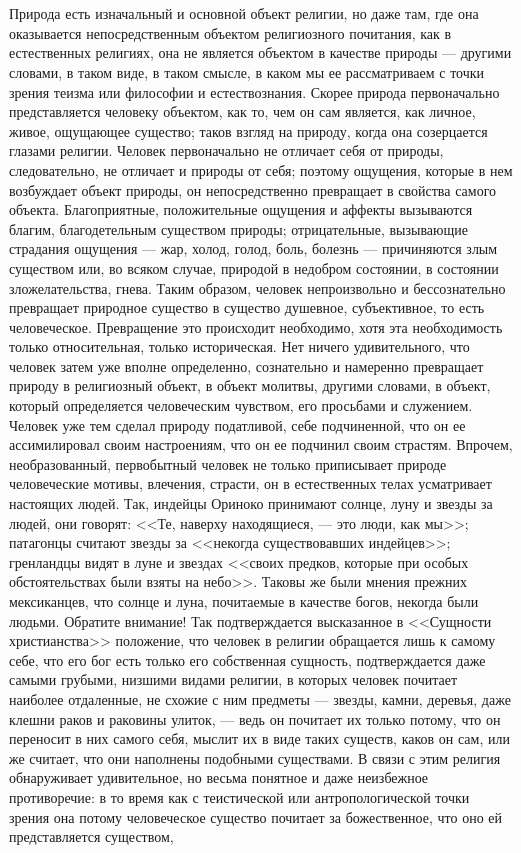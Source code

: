 \documentclass[12pt]{article}
\begin{document}
\section{}

Природа есть изначальный и основной объект религии, но даже там, где она оказывается непосредственным объектом религиозного почитания, как в естественных религиях, она не является объектом в качестве природы --- другими словами, в таком виде, в таком смысле, в каком мы ее рассматриваем с точки зрения теизма или философии и естествознания. Скорее природа первоначально представляется человеку объектом, как то, чем он сам является, как личное, живое, ощущающее существо; таков взгляд на природу, когда она созерцается глазами религии. Человек первоначально не отличает себя от природы, следовательно, не отличает и природы от себя; поэтому ощущения, которые в нем возбуждает объект природы, он непосредственно превращает в свойства самого объекта. Благоприятные, положительные ощущения и аффекты вызываются благим, благодетельным существом природы; отрицательные, вызывающие страдания ощущения --- жар, холод, голод, боль, болезнь --- причиняются злым существом или, во всяком случае, природой в недобром состоянии, в состоянии зложелательства, гнева. Таким образом, человек непроизвольно и бессознательно превращает природное существо в существо душевное, субъективное, то есть человеческое. Превращение это происходит необходимо, хотя эта необходимость только относительная, только историческая. Нет ничего удивительного, что человек затем уже вполне определенно, сознательно и намеренно превращает природу в религиозный объект, в объект молитвы, другими словами, в объект, который определяется человеческим чувством, его просьбами и служением. Человек уже тем сделал природу податливой, себе подчиненной, что он ее ассимилировал своим настроениям, что он ее подчинил своим страстям. Впрочем, необразованный, первобытный человек не только приписывает природе человеческие мотивы, влечения, страсти, он в естественных телах усматривает настоящих людей. Так, индейцы Ориноко принимают солнце, луну и звезды за людей, они говорят: <<Те, наверху находящиеся, --- это люди, как мы>>; патагонцы считают звезды за <<некогда существовавших индейцев>>; гренландцы видят в луне и звездах <<своих предков, которые при особых обстоятельствах были взяты на небо>>. Таковы же были мнения прежних мексиканцев, что солнце и луна, почитаемые в качестве богов, некогда были людьми. Обратите внимание! Так подтверждается высказанное в <<Сущности христианства>> положение, что человек в религии обращается лишь к самому себе, что его бог есть только его собственная сущность, подтверждается даже самыми грубыми, низшими видами религии, в которых человек почитает наиболее отдаленные, не схожие с ним предметы --- звезды, камни, деревья, даже клешни раков и раковины улиток, --- ведь он почитает их только потому, что он переносит в них самого себя, мыслит их в виде таких существ, каков он сам, или же считает, что они наполнены подобными существами. В связи с этим религия обнаруживает удивительное, но весьма понятное и даже неизбежное противоречие: в то время как с теистической или антропологической точки зрения она потому человеческое существо почитает за божественное, что оно ей представляется существом, 
\end{document}
